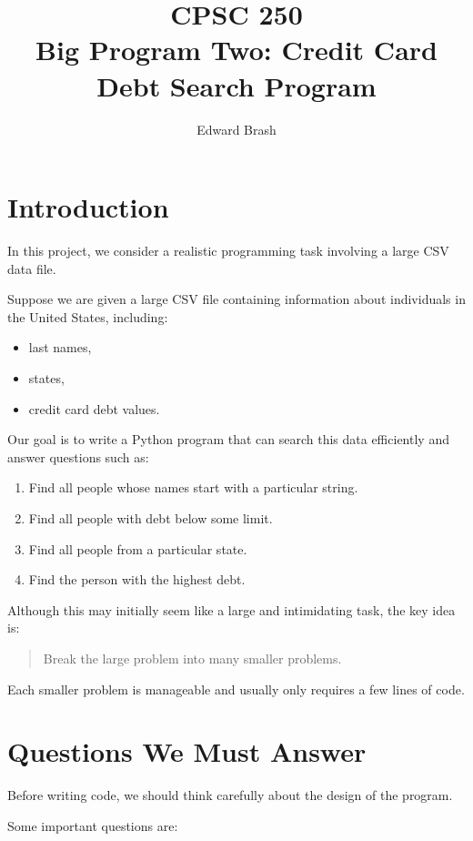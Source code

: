 \documentclass[11pt]{article}
\title{CPSC 250 \\ Big Program Two: Credit Card Debt Search Program}
\author{Edward Brash}
\date{}
\begin{document}
\maketitle

\section{Introduction}

In this project, we consider a realistic programming task involving a large CSV data file.

Suppose we are given a large CSV file containing information about individuals in the United States, including:

\begin{itemize}
    \item last names,
    \item states,
    \item credit card debt values.
\end{itemize}

Our goal is to write a Python program that can search this data efficiently and answer questions such as:

\begin{enumerate}
    \item Find all people whose names start with a particular string.
    \item Find all people with debt below some limit.
    \item Find all people from a particular state.
    \item Find the person with the highest debt.
\end{enumerate}

Although this may initially seem like a large and intimidating task, the key idea is:

\begin{quote}
Break the large problem into many smaller problems.
\end{quote}

Each smaller problem is manageable and usually only requires a few lines of code.

\section{Questions We Must Answer}

Before writing code, we should think carefully about the design of the program.

Some important questions are:
\end{document}
